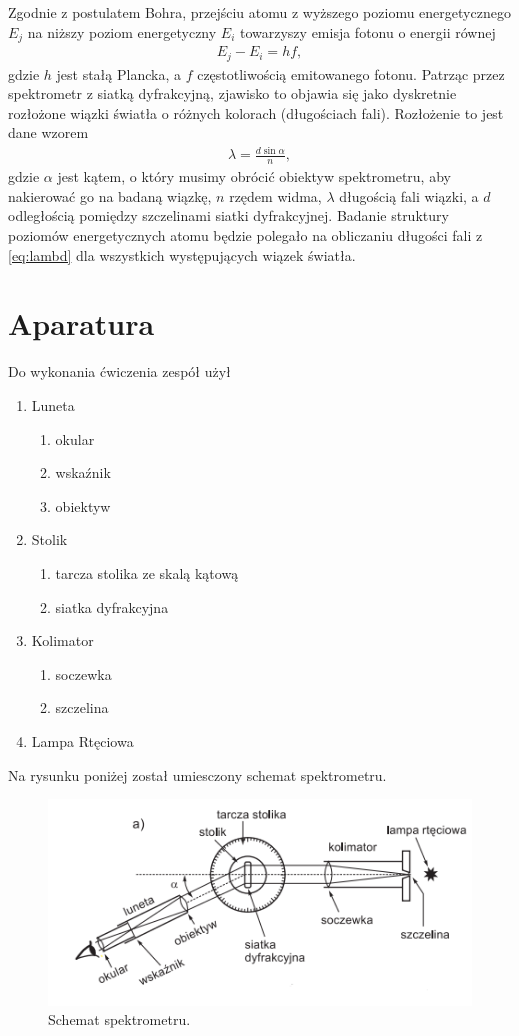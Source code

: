 \documentclass{article}
\begin{document}
Zgodnie z postulatem Bohra, przejściu atomu z wyższego poziomu
energetycznego $E_j$ na niższy poziom energetyczny $E_i$ towarzyszy
emisja fotonu o energii równej
\begin{align*}
    E_j - E_i = hf,
\end{align*}
gdzie $h$ jest stałą Plancka, a $f$ częstotliwością emitowanego fotonu.
Patrząc przez spektrometr z siatką dyfrakcyjną, zjawisko to objawia
się jako dyskretnie rozłożone wiązki światła o różnych kolorach (długościach fali). Rozłożenie to jest dane wzorem
\begin{align}
    \lambda = \frac{d\sin{\alpha}}{n},
    \label{eq:lambd}
\end{align}
gdzie $\alpha$ jest kątem, o który musimy obrócić obiektyw
spektrometru, aby nakierować go na badaną wiązkę, $n$ rzędem widma,
$\lambda$ długością fali wiązki, a $d$ odległością pomiędzy szczelinami
siatki dyfrakcyjnej. Badanie struktury poziomów energetycznych
atomu będzie polegało na obliczaniu długości fali z \eqref{eq:lambd}
dla wszystkich występujących wiązek światła.

\section{Aparatura}
Do wykonania ćwiczenia zespół użył 
\begin{enumerate}
    \item Luneta 
    \begin{enumerate}
     \item okular
     \item wskaźnik
     \item obiektyw
     \end{enumerate}
    \item Stolik
    \begin{enumerate}
     \item tarcza stolika ze skalą kątową
     \item siatka dyfrakcyjna
     \end{enumerate}
    \item Kolimator
    \begin{enumerate}
     \item soczewka
     \item szczelina
     \end{enumerate}
    \item Lampa Rtęciowa
\end{enumerate}
Na rysunku poniżej został umiesczony schemat spektrometru.
\begin{figure}[h!]
    \centering
    \includegraphics[scale=1]{cw83/spektrometr.png}
    \caption{Schemat spektrometru.}
\end{figure}
\end{document}
